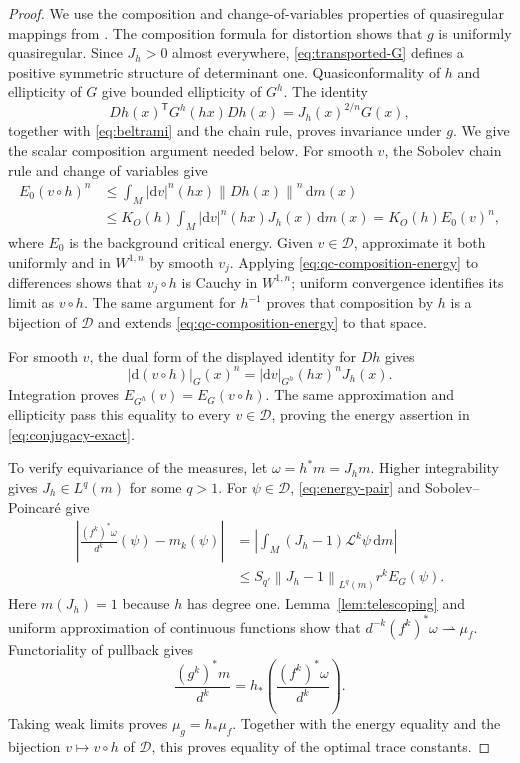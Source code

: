 \documentclass[10pt,a4paper]{amsart}
\newcommand{\Lop}{\mathcal L}
\newcommand{\Dcal}{\mathcal D}
\newcommand{\norm}[1]{\left\lVert #1\right\rVert}
\newcommand{\dd}{\mathrm d}
\numberwithin{equation}{section}
\begin{document}
\begin{proof}
We use the composition and change-of-variables properties of quasiregular mappings from \cite{Rickman93}. The composition formula for distortion shows that $g$ is uniformly quasiregular. Since $J_h>0$ almost everywhere, \eqref{eq:transported-G} defines a positive symmetric structure of determinant one. Quasiconformality of $h$ and ellipticity of $G$ give bounded ellipticity of $G^h$. The identity
\[
 Dh(x)^{\mathsf T}G^h(hx)Dh(x)=J_h(x)^{2/n}G(x),
\]
together with \eqref{eq:beltrami} and the chain rule, proves invariance under $g$. We give the scalar composition argument needed below. For smooth $v$, the Sobolev chain rule and change of variables give
\begin{equation}\label{eq:qc-composition-energy}
 \begin{split}
 E_0(v\circ h)^n
 &\le \int_M |\dd v|^n(hx)\norm{Dh(x)}^n\,\dd m(x)\\
 &\le K_O(h)\int_M |\dd v|^n(hx)J_h(x)\,\dd m(x)
 =K_O(h)E_0(v)^n,
 \end{split}
\end{equation}
where $E_0$ is the background critical energy. Given $v\in\Dcal$, approximate it both uniformly and in $W^{1,n}$ by smooth $v_j$. Applying \eqref{eq:qc-composition-energy} to differences shows that $v_j\circ h$ is Cauchy in $W^{1,n}$; uniform convergence identifies its limit as $v\circ h$. The same argument for $h^{-1}$ proves that composition by $h$ is a bijection of $\Dcal$ and extends \eqref{eq:qc-composition-energy} to that space.

For smooth $v$, the dual form of the displayed identity for $Dh$ gives
\[
 |\dd(v\circ h)|_G(x)^n
 =|\dd v|_{G^h}(hx)^nJ_h(x).
\]
Integration proves $E_{G^h}(v)=E_G(v\circ h)$. The same approximation and ellipticity pass this equality to every $v\in\Dcal$, proving the energy assertion in \eqref{eq:conjugacy-exact}.

To verify equivariance of the measures, let $\omega=h^*m=J_hm$. Higher integrability gives $J_h\in L^q(m)$ for some $q>1$. For $\psi\in\Dcal$, \eqref{eq:energy-pair} and Sobolev--Poincar\'e give
\begin{align*}
 \left|\frac{(f^k)^*\omega}{d^k}(\psi)-m_k(\psi)\right|
 &=\left|\int_M(J_h-1)\Lop^k\psi\,\dd m\right|\\
 &\le S_{q'}\norm{J_h-1}_{L^q(m)}r^kE_G(\psi).
\end{align*}
Here $m(J_h)=1$ because $h$ has degree one. Lemma~\ref{lem:telescoping} and uniform approximation of continuous functions show that $d^{-k}(f^k)^*\omega\rightharpoonup\mu_f$. Functoriality of pullback gives
\[
 \frac{(g^k)^*m}{d^k}
 =h_*\left(\frac{(f^k)^*\omega}{d^k}\right).
\]
Taking weak limits proves $\mu_g=h_*\mu_f$. Together with the energy equality and the bijection $v\mapsto v\circ h$ of $\Dcal$, this proves equality of the optimal trace constants.


\end{proof}
\end{document}

